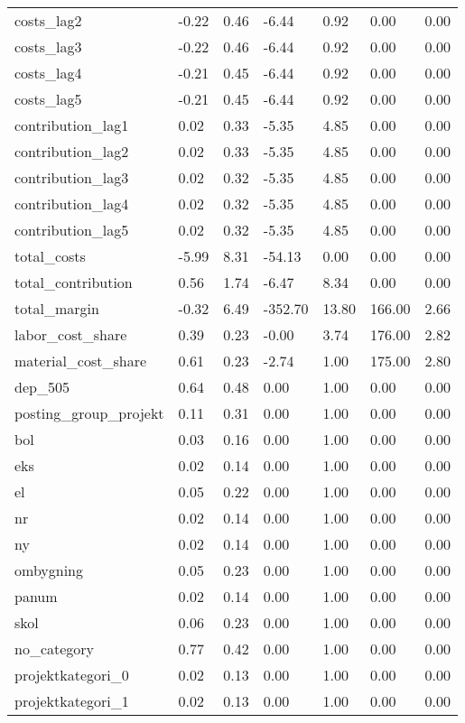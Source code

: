 \begin{landscape}
\begin{longtable}[h!]{lllllll}
costs_lag2 & -0.22 & 0.46 & -6.44 & 0.92 & 0.00 & 0.00 \\
costs_lag3 & -0.22 & 0.46 & -6.44 & 0.92 & 0.00 & 0.00 \\
costs_lag4 & -0.21 & 0.45 & -6.44 & 0.92 & 0.00 & 0.00 \\
costs_lag5 & -0.21 & 0.45 & -6.44 & 0.92 & 0.00 & 0.00 \\
contribution_lag1 & 0.02 & 0.33 & -5.35 & 4.85 & 0.00 & 0.00 \\
contribution_lag2 & 0.02 & 0.33 & -5.35 & 4.85 & 0.00 & 0.00 \\
contribution_lag3 & 0.02 & 0.32 & -5.35 & 4.85 & 0.00 & 0.00 \\
contribution_lag4 & 0.02 & 0.32 & -5.35 & 4.85 & 0.00 & 0.00 \\
contribution_lag5 & 0.02 & 0.32 & -5.35 & 4.85 & 0.00 & 0.00 \\
total_costs & -5.99 & 8.31 & -54.13 & 0.00 & 0.00 & 0.00 \\
total_contribution & 0.56 & 1.74 & -6.47 & 8.34 & 0.00 & 0.00 \\
total_margin & -0.32 & 6.49 & -352.70 & 13.80 & 166.00 & 2.66 \\
labor_cost_share & 0.39 & 0.23 & -0.00 & 3.74 & 176.00 & 2.82 \\
material_cost_share & 0.61 & 0.23 & -2.74 & 1.00 & 175.00 & 2.80 \\
dep_505 & 0.64 & 0.48 & 0.00 & 1.00 & 0.00 & 0.00 \\
posting_group_projekt & 0.11 & 0.31 & 0.00 & 1.00 & 0.00 & 0.00 \\
bol & 0.03 & 0.16 & 0.00 & 1.00 & 0.00 & 0.00 \\
eks & 0.02 & 0.14 & 0.00 & 1.00 & 0.00 & 0.00 \\
el & 0.05 & 0.22 & 0.00 & 1.00 & 0.00 & 0.00 \\
nr & 0.02 & 0.14 & 0.00 & 1.00 & 0.00 & 0.00 \\
ny & 0.02 & 0.14 & 0.00 & 1.00 & 0.00 & 0.00 \\
ombygning & 0.05 & 0.23 & 0.00 & 1.00 & 0.00 & 0.00 \\
panum & 0.02 & 0.14 & 0.00 & 1.00 & 0.00 & 0.00 \\
skol & 0.06 & 0.23 & 0.00 & 1.00 & 0.00 & 0.00 \\
no_category & 0.77 & 0.42 & 0.00 & 1.00 & 0.00 & 0.00 \\
projektkategori_0 & 0.02 & 0.13 & 0.00 & 1.00 & 0.00 & 0.00 \\
projektkategori_1 & 0.02 & 0.13 & 0.00 & 1.00 & 0.00 & 0.00 \\

\end{longtable}
\end{landscape}
